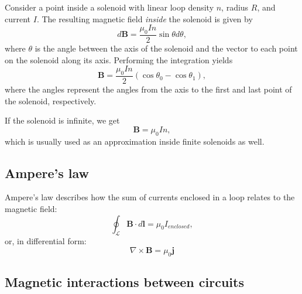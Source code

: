 \documentclass[a4paper, 12pt]{article}
\renewcommand{\vec}[1]{\mathbf{#1}}
\renewcommand{\j}{\ensuremath{\vec{j}}}
\newcommand{\B}{\ensuremath{\vec{B}}}
\begin{document}
            Consider a point inside a solenoid with linear loop density $n$, radius $R$, and current $I$. 
            The resulting magnetic field \textit{inside} the solenoid is given by
            \begin{equation}
                d\B = \frac{\mu_0 I n}{2}\sin\theta d\theta,
            \end{equation}
            where $\theta$ is the angle between the axis of the solenoid and the vector to each point on the solenoid along its axis.
            Performing the integration yields
            \begin{equation}
                \B = \frac{\mu_0 In}{2}\left(\cos\theta_0 - \cos\theta_1\right),
            \end{equation}
            where the angles represent the angles from the axis to the first and last point of the solenoid, respectively. 

            If the solenoid is infinite, we get
            \begin{equation}
                \B = \mu_0 In,
            \end{equation}
            which is usually used as an approximation inside finite solenoids as well.
    
    \subsection{Ampere's law}
        Ampere's law describes how the sum of currents enclosed in a loop relates to the magnetic field: 
        \begin{equation}
            \oint_\mathcal{L}\B\cdot d\vec{l} = \mu_0 I_{enclosed},
        \end{equation}
        or, in differential form: 
        \begin{equation}
            \nabla\times\B = \mu_0\j
        \end{equation}
    
    \subsection{Magnetic interactions between circuits}
\end{document}
